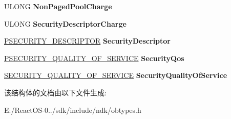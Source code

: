 \begin{DoxyCompactItemize}
U\+L\+O\+NG {\bfseries Non\+Paged\+Pool\+Charge}
\item 
\mbox{\label{struct___o_b_j_e_c_t___c_r_e_a_t_e___i_n_f_o_r_m_a_t_i_o_n_a0ba7af855bb51bba4933a84e13c6de6f}} 
U\+L\+O\+NG {\bfseries Security\+Descriptor\+Charge}
\item 
\mbox{\label{struct___o_b_j_e_c_t___c_r_e_a_t_e___i_n_f_o_r_m_a_t_i_o_n_a31e8b5dec7fa0d31173ed13b69b83824}} 
\hyperlink{struct___s_e_c_u_r_i_t_y___d_e_s_c_r_i_p_t_o_r}{P\+S\+E\+C\+U\+R\+I\+T\+Y\+\_\+\+D\+E\+S\+C\+R\+I\+P\+T\+OR} {\bfseries Security\+Descriptor}
\item 
\mbox{\label{struct___o_b_j_e_c_t___c_r_e_a_t_e___i_n_f_o_r_m_a_t_i_o_n_a558f9c51d6b92be519f871a9591cad06}} 
\hyperlink{struct___s_e_c_u_r_i_t_y___q_u_a_l_i_t_y___o_f___s_e_r_v_i_c_e}{P\+S\+E\+C\+U\+R\+I\+T\+Y\+\_\+\+Q\+U\+A\+L\+I\+T\+Y\+\_\+\+O\+F\+\_\+\+S\+E\+R\+V\+I\+CE} {\bfseries Security\+Qos}
\item 
\mbox{\label{struct___o_b_j_e_c_t___c_r_e_a_t_e___i_n_f_o_r_m_a_t_i_o_n_ae16569fb79d4df6379a37901feda337e}} 
\hyperlink{struct___s_e_c_u_r_i_t_y___q_u_a_l_i_t_y___o_f___s_e_r_v_i_c_e}{S\+E\+C\+U\+R\+I\+T\+Y\+\_\+\+Q\+U\+A\+L\+I\+T\+Y\+\_\+\+O\+F\+\_\+\+S\+E\+R\+V\+I\+CE} {\bfseries Security\+Quality\+Of\+Service}
\end{DoxyCompactItemize}


该结构体的文档由以下文件生成\+:\begin{DoxyCompactItemize}
\item 
E\+:/\+React\+O\+S-\/0../sdk/include/ndk/obtypes.\+h\end{DoxyCompactItemize}
